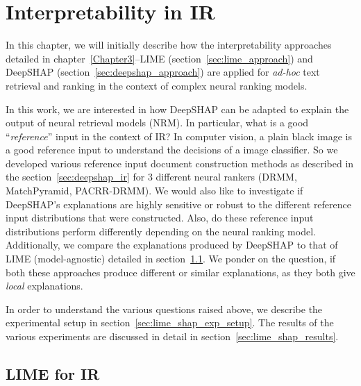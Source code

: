 \chapter{Interpretability in IR} %

\label{Chapter5} %


In this chapter, we will initially describe how the interpretability approaches detailed in chapter~\ref{Chapter3}--LIME (section~\ref{sec:lime_approach}) and DeepSHAP (section~\ref{sec:deepshap_approach}) are applied for \textit{ad-hoc} text retrieval and ranking in the context of complex neural ranking models. 

In this work, we are interested in how DeepSHAP can be adapted to explain the output of neural retrieval models (NRM). In particular, what is a good ``\textit{reference}'' input in the context of IR? In computer vision, a plain black image is a good reference input to understand the decisions of a image classifier. So we developed various reference input document construction methods as described in the section~\ref{sec:deepshap_ir} for 3 different neural rankers (DRMM, MatchPyramid, PACRR-DRMM). We would also like to investigate if DeepSHAP's explanations are highly sensitive or robust to the different reference input distributions that were constructed. Also, do these reference input distributions perform differently depending on the neural ranking model. Additionally, we compare the explanations produced by DeepSHAP to that of LIME (model-agnostic) detailed in section~\ref{sec:lime_ir}. We ponder on the question, if both these approaches produce different or similar explanations, as they both give \textit{local} explanations. 

In order to understand the various questions raised above, we describe the experimental setup in section~\ref{sec:lime_shap_exp_setup}. The results of the various experiments are discussed in detail in section~\ref{sec:lime_shap_results}.

\section{LIME for IR}\label{sec:lime_ir}

